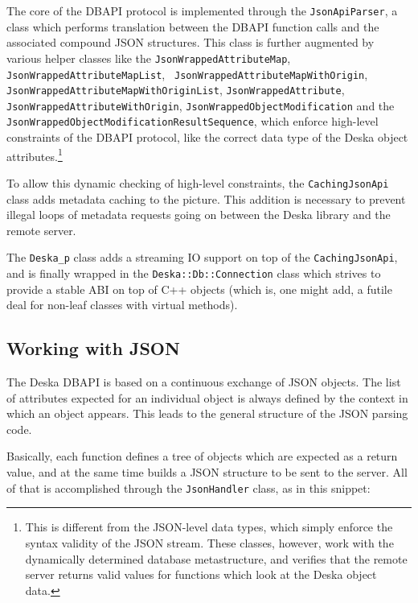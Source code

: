 \documentclass[deska]{subfiles}
\begin{document}
The core of the DBAPI protocol is implemented through the {\tt JsonApiParser}, a class which performs translation
between the DBAPI function calls and the associated compound JSON structures.  This class is further augmented by
various helper classes like the {\tt JsonWrappedAttributeMap}, {\tt JsonWrappedAttributeMapList}, {\tt
JsonWrappedAttributeMapWithOrigin}, {\tt JsonWrappedAttributeMapWithOriginList}, {\tt JsonWrappedAttribute}, {\tt
JsonWrappedAttributeWithOrigin}, {\tt JsonWrappedObjectModification} and the {\tt
JsonWrappedObjectModificationResultSequence}, which enforce high-level constraints of the DBAPI protocol, like the
correct data type of the Deska object attributes.\footnote{This is different from the JSON-level data types, which simply
enforce the syntax validity of the JSON stream.  These classes, however, work with the dynamically determined database
metastructure, and verifies that the remote server returns valid values for functions which look at the Deska object
data.}

To allow this dynamic checking of high-level constraints, the {\tt CachingJsonApi} class adds metadata caching to the
picture.  This addition is necessary to prevent illegal loops of metadata requests going on between the Deska library
and the remote server.

The {\tt Deska\_p} class adds a streaming IO support on top of the {\tt CachingJsonApi}, and is finally wrapped in the
{\tt Deska::Db::Connection} class which strives to provide a stable ABI on top of C++ objects (which is, one might add,
a futile deal for non-leaf classes with virtual methods).

\subsection{Working with JSON}

The Deska DBAPI is based on a continuous exchange of JSON objects.  The list of attributes expected for an individual
object is always defined by the context in which an object appears.  This leads to the general structure of the JSON
parsing code.

Basically, each function defines a tree of objects which are expected as a return value, and at the same time builds a
JSON structure to be sent to the server.  All of that is accomplished through the {\tt JsonHandler} class, as in this
snippet:
\end{document}
